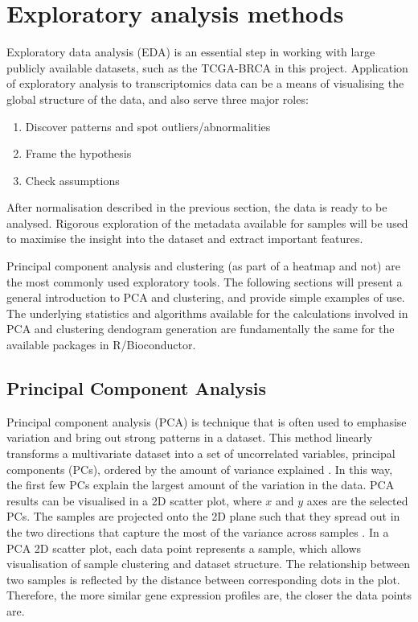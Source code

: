     
             
   
    
    
   
\newpage    
\section{Exploratory analysis methods}
    
    Exploratory data analysis (EDA) is an essential step in working with large publicly available datasets, such as the TCGA-BRCA in this project. Application of exploratory analysis to transcriptomics data can be a means of visualising the global structure of the data, and also serve three major roles: 
    
    \begin{enumerate}
      \item Discover patterns and spot outliers/abnormalities
      \item Frame the hypothesis
      \item Check assumptions 
    \end{enumerate}
    
    After normalisation described in the previous section, the data is ready to be analysed. Rigorous exploration of the metadata available for samples will be used to maximise the insight into the dataset and extract important features.
    
    Principal component analysis and clustering (as part of a heatmap and not) are the most commonly used exploratory tools. The following sections will present a general introduction to PCA and clustering, and provide simple examples of use. The underlying statistics and algorithms available for the calculations involved in PCA and clustering dendogram generation are fundamentally the same for the available packages in R/Bioconductor. 
    
    
    \subsection{Principal Component Analysis}
    
    Principal component analysis (PCA) is technique that is often used to emphasise variation and bring out strong patterns in a dataset. This method linearly transforms a multivariate dataset into a set of uncorrelated variables, principal components (PCs), ordered by the amount of variance explained \cite{jolliffe2002principal}. In this way, the first few PCs explain the largest amount of the variation in the data. PCA results can be visualised in a 2D scatter plot, where $x$ and $y$ axes are the selected PCs. The samples are projected onto the 2D plane such that they spread out in the two directions that capture the most of the variance across samples \cite{Love2016RNA-SeqApproved}. 
    In a PCA 2D scatter plot, each data point represents a sample, which allows visualisation of sample clustering and dataset structure.  The relationship between two samples is reflected by the distance between corresponding dots in the plot. Therefore, the more similar gene expression profiles are, the closer the data points are.    
   
